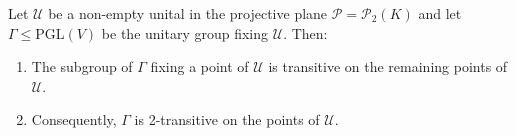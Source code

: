 Let $\mathcal{U}$ be a non-empty unital in the projective plane $\mathcal{P} = \mathcal{P}_2(K)$ and let $\Gamma \leq \text{PGL}(V)$ be the unitary group fixing $\mathcal{U}$. Then:
\begin{enumerate}
\item[(i)] The subgroup of $\Gamma$ fixing a point of $\mathcal{U}$ is transitive on the remaining points of $\mathcal{U}$.
\item[(ii)] Consequently, $\Gamma$ is 2-transitive on the points of $\mathcal{U}$.
\end{enumerate}

